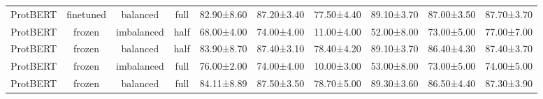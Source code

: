 \begin{tabular}{lccccccccc}
    ProtBERT &      finetuned &   balanced &      full &  82.90±8.60 & 87.20±3.40 & 77.50±4.40 & 89.10±3.70 &  87.00±3.50 &  87.70±3.70 \\
    ProtBERT &         frozen & imbalanced &      half &  68.00±4.00 & 74.00±4.00 & 11.00±4.00 & 52.00±8.00 &  73.00±5.00 &  77.00±7.00 \\
    ProtBERT &         frozen &   balanced &      half &  83.90±8.70 & 87.40±3.10 & 78.40±4.20 & 89.10±3.70 &  86.40±4.30 &  87.40±3.70 \\
    ProtBERT &         frozen & imbalanced &      full &  76.00±2.00 & 74.00±4.00 & 10.00±3.00 & 53.00±8.00 &  73.00±5.00 &  74.00±5.00 \\
    ProtBERT &         frozen &   balanced &      full &  84.11±8.89 & 87.50±3.50 & 78.70±5.00 & 89.30±3.60 &  86.50±4.40 &  87.30±3.90 \\
\bottomrule
\end{tabular}
